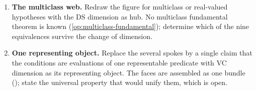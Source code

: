 \begin{enumerate}[leftmargin=*,itemsep=3pt]
\item \textbf{The multiclass web.} Redraw the figure for multiclass or real-valued hypotheses with the DS dimension as hub. No multiclass fundamental theorem is known (\cref{op:multiclass-fundamental}); determine which of the nine equivalences survive the change of dimension.

\item \textbf{One representing object.} Replace the several spokes by a single claim that the conditions are evaluations of one representable predicate with VC dimension as its representing object. The faces are assembled as one bundle (); state the universal property that would unify them, which is open.
\end{enumerate}
